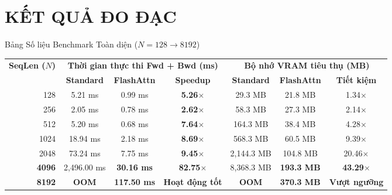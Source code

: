 \documentclass[aspectratio=169,11pt]{beamer}
\begin{document}
\section{KẾT QUẢ ĐO ĐẠC}
\begin{frame}{Bảng Số liệu Benchmark Toàn diện ($N=128 \to 8192$)}
  \vspace{-0.4em}
  \begin{center}
  \fontsize{7.5pt}{9.5pt}\selectfont
  \setlength{\tabcolsep}{4.5pt}
  \renewcommand{\arraystretch}{1.08}
  \begin{tabular}{rcccccc}
    \toprule
    \multirow{2}{*}{\textbf{SeqLen ($N$)}} & \multicolumn{3}{c}{\textbf{Thời gian thực thi Fwd + Bwd (ms)}} & \multicolumn{3}{c}{\textbf{Bộ nhớ VRAM tiêu thụ (MB)}} \\
    \cmidrule(lr){2-4} \cmidrule(lr){5-7}
     & \textbf{Standard} & \textbf{FlashAttn} & \textbf{Speedup} & \textbf{Standard} & \textbf{FlashAttn} & \textbf{Tiết kiệm} \\
    \midrule
    128  & 5.21 ms    & 0.99 ms   & \textbf{5.26$\times$}  & 29.3 MB   & 21.8 MB  & 1.34$\times$ \\
    256  & 2.05 ms    & 0.78 ms   & \textbf{2.62$\times$}  & 58.3 MB   & 27.3 MB  & 2.14$\times$ \\
    512  & 5.20 ms    & 0.68 ms   & \textbf{7.64$\times$}  & 164.3 MB  & 38.4 MB  & 4.28$\times$ \\
    1024 & 18.94 ms   & 2.18 ms   & \textbf{8.69$\times$}  & 568.3 MB  & 60.5 MB  & 9.39$\times$ \\
    2048 & 73.24 ms   & 7.75 ms   & \textbf{9.45$\times$}  & 2,144.3 MB & 104.8 MB & 20.46$\times$ \\
    \textbf{4096} & 2,496.00 ms & \textbf{30.16 ms} & \textbf{\color{BrandEmerald}82.75$\times$} & 8,368.3 MB & \textbf{193.3 MB} & \textbf{\color{BrandEmerald}43.29$\times$} \\
    \textbf{8192} & \textbf{\color{BrandCrimson}OOM} & \textbf{117.50 ms} & \textbf{\color{BrandEmerald}Hoạt động tốt} & \textbf{\color{BrandCrimson}OOM} & \textbf{370.3 MB} & \textbf{\color{BrandEmerald}Vượt ngưỡng} \\
    \bottomrule
  \end{tabular}
  \end{center}


\end{frame}
\end{document}
